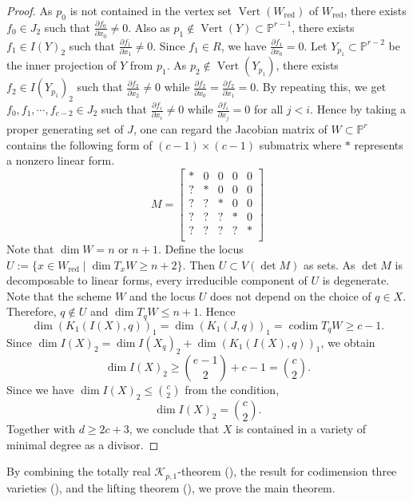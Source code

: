 \documentclass[11pt,letterpaper,reqno]{amsart}
\theoremstyle{plain}
\theoremstyle{definition}
\newtheorem{open problem}[theorem]{Open Problem}
\newtheorem{remark and notation}[theorem]{Remark and Notation}
\newtheorem{remark and definition}[theorem]{Remark and Definition}
\newtheorem{definition and notation}[theorem]{Definition and Notation}
\newtheorem{notation and convention}[theorem]{Notation and Convention}
\newtheorem{notation and remark}[theorem]{Notation and Remark}
\newtheorem{convention and notation}[theorem]{Convention and Notation}
\def \p {\mathbb{P}}
\def \codim {\operatorname{codim}}
\def \det {\operatorname{det}}
\def \ver {\operatorname{Vert}}
\begin{document}
\begin{proof}
    As $p_0$ is not contained in the vertex set $\ver(W_{\text{red}})$ of $W_{\text{red}}$, there exists $f_0\in J_2$ such that $\frac{\partial f_0}{\partial x_0}\neq 0$.
    Also as $p_1\notin\ver(Y)\subset\p^{r-1}$, there exists $f_1\in I(Y)_2$ such that $\frac{\partial f_1}{\partial x_1}\neq 0$. Since $f_1\in R$, we have $\frac{\partial f_1}{\partial x_0}=0$.
    Let $Y_{p_1}\subset\p^{r-2}$ be the inner projection of $Y$ from $p_1$.
    As $p_2\notin\ver(Y_{p_1})$, there exists $f_2\in I(Y_{p_1})_2$ such that $\frac{\partial f_2}{\partial x_2}\neq 0$ while $\frac{\partial f_2}{\partial x_0}=\frac{\partial f_2}{\partial x_1}=0$.
    By repeating this, we get $f_0,f_1,\cdots,f_{c-2}\in J_2$ such that $\frac{\partial f_i}{\partial x_i}\neq 0$ while $\frac{\partial f_i}{\partial x_j}=0$ for all $j<i$.
    Hence by taking a proper generating set of $J$, one can regard the Jacobian matrix of $W\subset\p^r$ contains the following form of $(c-1) \times (c-1)$ submatrix where $*$ represents a nonzero linear form.
    \[
    M=
    \begin{bmatrix}
        * & 0 & 0 & 0 & 0 \\
        ? & * & 0 & 0 & 0 \\
        ? & ? & * & 0 & 0 \\
        ? & ? & ? & * & 0 \\
        ? & ? & ? & ? & * \\
    \end{bmatrix}
    \]
    Note that $\dim W = n$ or $n+1$. Define the locus $U:=\{x\in W_{\text{red}}\mid \dim T_xW\geq n+2\}$.
    Then $U\subset V(\det M)$ as sets.
    As $\det M$ is decomposable to linear forms, every irreducible component of $U$ is degenerate.
    Note that the scheme $W$ and the locus $U$ does not depend on the choice of $q\in X$.
    Therefore, $q\notin U$ and $\dim T_qW\leq n+1$.
    Hence $$\dim (K_1(I(X),q))_1=\dim (K_1(J,q))_1=\codim T_qW\geq c-1.$$
    Since $\dim I(X)_2=\dim I(X_q)_2+\dim (K_1(I(X),q))_1$, we obtain
    $$\dim I(X)_2\geq\binom{e-1}{2}+c-1=\binom{c}{2}.$$
    Since we have $\dim I(X)_2\leq \binom{c}{2}$ from the condition, $$\dim I(X)_2=\binom{c}{2}.$$
    Together with $d\geq 2c+3$, we conclude that $X$ is contained in a variety of minimal degree as a divisor.
\end{proof}

By combining the totally real $\mathcal{K}_{p,1}$-theorem (), the result for codimension three varieties (), and the lifting theorem (), we prove the main theorem.
\end{document}

